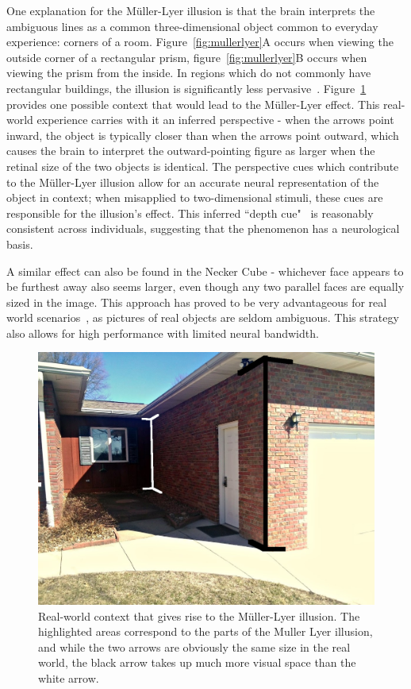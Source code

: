 \documentclass[11pt]{isuthesis}\usepackage[]{graphicx}\usepackage[]{color}
\begin{document}
One explanation for the M\"uller-Lyer illusion \citep{gregory1968perceptual} is that the brain interprets the ambiguous lines as a common three-dimensional object common to everyday experience: corners of a room. Figure~\ref{fig:mullerlyer}A occurs when viewing the outside corner of a rectangular prism, figure~\ref{fig:mullerlyer}B occurs when viewing the prism from the inside.  In regions which do not commonly have rectangular buildings, the illusion is significantly less pervasive~\citep{mullerlyerafrica}. Figure~\ref{fig:mullerlyerreal} provides one possible context that would lead to the M\"uller-Lyer effect. This real-world experience carries with it an inferred perspective - when the arrows point inward, the object is typically closer than when the arrows point outward, which causes the brain to interpret the outward-pointing figure as larger when the retinal size of the two objects is identical. The perspective cues which contribute to the M\"uller-Lyer illusion allow for an accurate neural representation of the object in context; when misapplied to two-dimensional stimuli, these cues are responsible for the illusion's effect. This inferred ``depth cue"~\citep{gregory1968perceptual} is reasonably consistent across individuals, suggesting that the phenomenon has a neurological basis. 

A similar effect can also be found in the Necker Cube - whichever face appears to be furthest away also seems larger, even though any two parallel faces are equally sized in the image. This approach has proved to be very advantageous for real world scenarios~\citep{gregory1968perceptual}, as pictures of real objects are seldom ambiguous. This strategy also allows for high performance with limited neural bandwidth.

\begin{figure}\centering
\includegraphics[width=5in,keepaspectratio=TRUE]{mullerlyerhouse1}
\caption[Real world context for the M\"uller-Lyer illusion]{Real-world context that gives rise to the M\"uller-Lyer illusion. The highlighted areas correspond to the parts of the Muller Lyer illusion, and while the two arrows are obviously the same size in the real world, the black arrow takes up much more visual space than the white arrow.}\label{fig:mullerlyerreal}
\end{figure}
\end{document}
